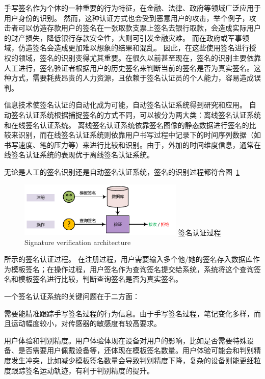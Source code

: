 手写签名作为个体的一种重要的行为特征，在金融、法律、政府等领域广泛应用于用户身份的识别。 然而，这种认证方式也会受到恶意用户的攻击，举个例子，攻击者可以仿造存款用户的签名在一张取款支票上签名去银行取款，会造成实际用户的财产损失，降低银行存款安全性，大则可引发金融灾难。 而在政府或军事领域，仿造签名会造成更加难以想象的结果和混乱。 因此，在这些使用签名进行授权的领域，签名的识别变得尤其重要。在很久以前甚至现在，签名的识别主要依靠人工进行，签名验证者根据用户的历史签名来判断当前的签名是否为真实签名。这种方式，需要耗费昂贵的人力资源，且依赖于签名认证员的个人能力，容易造成误判。

信息技术使签名认证的自动化成为可能，自动签名认证系统得到研究和应用。 自动签名认证系统根据捕捉签名的方式不同，可以被分为两大类：离线签名认证系统和在线签名认证系统。 离线签名认证系统依靠签名图像的静态数据进行签名的比较来识别，而在线签名认证系统则依靠用户书写过程中记录下的时间序列数据（如书写速度、笔的压力等）来进行比较和识别。由于，外加的时间维度信息，通常在线签名认证系统的表现优于离线签名认证系统。



无论是人工的签名识别还是自动签名认证系统，签名的识别过程都符合图~\ref{fig:signature-verification-architecture}
\begin{figure}[!htp]
  \centering
  \includegraphics[width=0.7\textwidth]{figure/verification-work-flow.pdf}
  \bicaption
    {签名认证过程}
    {Signature verification architecture}
  \label{fig:signature-verification-architecture}
\end{figure}所示的签名认证过程。 在注册过程，用户需要输入多个他/她的签名存入数据库作为模板签名；在操作过程，用户签名作为查询签名提交给系统，系统将这个查询签名和模板签名进行比较，判断查询签名是否为真实签名。

一个签名认证系统的关键问题在于二方面：
\begin{enumerate*}[label=\itshape\alph*)\upshape]
    \item 需要能精准跟踪手写签名过程的行为信息。由于手写签名过程，笔记变化多样，而且运动幅度较小，对传感器的敏感度有较高要求。
    \item 用户体验和判别精度。用户体验体现在设备对用户的影响，比如是否需要特殊设备、是否需要用户佩戴设备等，还体现在模板签名数量。用户体验可能会和判别精度发生冲突，比如减少模板签名数量会导致判别精度下降，复杂的设备则能更细粒度跟踪签名运动轨迹，有利于判别精度的提升。
\end{enumerate*}

